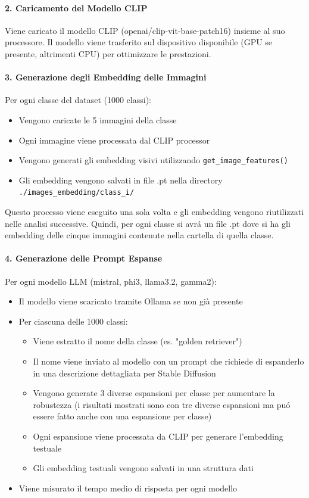 \documentclass{article}
\begin{document}
\paragraph{2. Caricamento del Modello CLIP}
 Viene caricato il modello CLIP (openai/clip-vit-base-patch16) insieme al suo processore. Il modello viene trasferito sul dispositivo disponibile (GPU se presente, altrimenti CPU) per ottimizzare le prestazioni.

\paragraph{3. Generazione degli Embedding delle Immagini}
Per ogni classe del dataset (1000 classi):
\begin{itemize}
    \item Vengono caricate le 5 immagini della classe
    \item Ogni immagine viene processata dal CLIP processor
    \item Vengono generati gli embedding visivi utilizzando \texttt{get\_image\_features()}
    \item Gli embedding vengono salvati in file .pt nella directory \texttt{./images\_embedding/class\_i/}
\end{itemize}
Questo processo viene eseguito una sola volta e gli embedding vengono riutilizzati nelle analisi successive. Quindi, per ogni classe si avrá un file .pt dove si ha gli embedding delle cinque immagini contenute nella cartella di quella classe. 

\paragraph{4. Generazione delle Prompt Espanse}
Per ogni modello LLM (mistral, phi3, llama3.2, gamma2):
\begin{itemize}
    \item Il modello viene scaricato tramite Ollama se non già presente
    \item Per ciascuna delle 1000 classi:
    \begin{itemize}
        \item Viene estratto il nome della classe (es. "golden retriever")
        \item Il nome viene inviato al modello con un prompt che richiede di espanderlo in una descrizione dettagliata per Stable Diffusion
        \item Vengono generate 3 diverse espansioni per classe per aumentare la robustezza (i risultati mostrati sono con tre diverse espansioni ma puó essere fatto anche con una espansione per classe)
        \item Ogni espansione viene processata da CLIP per generare l'embedding testuale
        \item Gli embedding testuali vengono salvati in una struttura dati
    \end{itemize}
    \item Viene misurato il tempo medio di risposta per ogni modello
\end{itemize}
\end{document}

